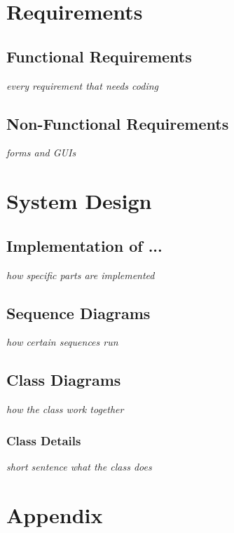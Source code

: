 \documentclass[a4paper, 10pt, fleqn]{article}
\begin{document}
	\section{Requirements}
		\subsection{Functional Requirements}
			\textit{every requirement that needs coding}
		\subsection{Non-Functional Requirements}
			\textit{forms and GUIs}
	\section{System Design}
		\subsection{Implementation of ...}
			\textit{how specific parts are implemented}
		\subsection{Sequence Diagrams}
			\textit{how certain sequences run}
		\subsection{Class Diagrams}
			\textit{how the class work together}
			\subsubsection{Class Details}
				\textit{short sentence what the class does}

\clearpage
\thispagestyle{empty}
	\section*{Appendix}
\end{document}
